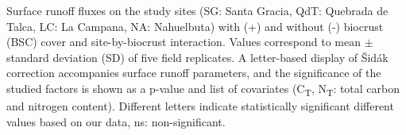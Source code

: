 \begin{table}[htbp] %
    \centering
    \footnotesize %
    \begin{threeparttable}
      \caption[Surface runoff fluxes on the study sites]{Surface runoff fluxes on the study sites (SG: Santa Gracia, QdT: Quebrada de Talca, LC: La Campana, NA: Nahuelbuta) with (+) and without (-) biocrust (BSC) cover and site-by-biocrust interaction. Values correspond to mean $\pm$ standard deviation (SD) of five field replicates. A letter-based display of Šidák correction accompanies surface runoff parameters, and the significance of the studied factors is shown as a p-value and list of covariates (C\textsubscript{T}, N\textsubscript{T}: total carbon and nitrogen content). Different letters indicate statistically significant different values based on our data, ns: non-significant.}
      \label{tab:M2-runoff_fluxes}
      \setlength{\tabcolsep}{3pt} %
  

\end{threeparttable}
\end{table}

